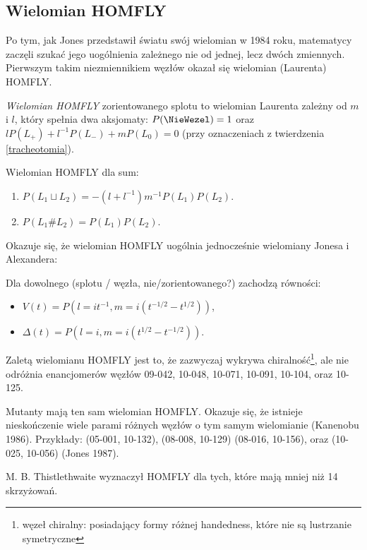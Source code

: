 \subsection{Wielomian HOMFLY}
Po tym, jak Jones przedstawił światu swój wielomian w 1984 roku, matematycy zaczęli szukać jego uogólnienia zależnego nie od jednej, lecz dwóch zmiennych.
Pierwszym takim niezmiennikiem węzłów okazał się wielomian (Laurenta) HOMFLY.

\begin{definicja}
\emph{Wielomian HOMFLY} zorientowanego splotu to wielomian Laurenta zależny od $m$ i $l$, który spełnia dwa  aksjomaty: $P(\NieWezel) = 1$ oraz $l P(L_+) + l^{-1} P(L_-) + mP(L_0) = 0$ (przy oznaczeniach z twierdzenia \ref{tracheotomia}).
\end{definicja}

\begin{twierdzenie} Wielomian HOMFLY dla sum:
\begin{enumerate}
	\item $P(L_1 \sqcup L_2) = - (l + l^{-1}) m^{-1} P(L_1) P(L_2)$.
	\item $P(L_1 \# L_2) = P(L_1) P(L_2)$.
\end{enumerate}
\end{twierdzenie}

Okazuje się, że wielomian HOMFLY uogólnia jednocześnie wielomiany Jonesa i Alexandera:

\begin{twierdzenie} Dla dowolnego (splotu / węzła, nie/zorientowanego?) zachodzą równości:
\begin{itemize}
\item $V(t) = P(l = it^{-1}, m = i(t^{-1/2} - t^{1/2}))$,
\item $\Delta(t) = P(l = i, m = i(t^{1/2} - t^{-1/2}))$.
\end{itemize}
\end{twierdzenie}

Zaletą wielomianu HOMFLY jest to, że zazwyczaj wykrywa chiralność\footnote{węzeł chiralny: posiadający formy różnej handedness, które nie są lustrzanie symetryczne}, ale nie odróżnia enancjomerów węzłów 09-042, 10-048, 10-071, 10-091, 10-104, oraz 10-125.

Mutanty mają ten sam wielomian HOMFLY.
Okazuje się, że istnieje nieskończenie wiele parami różnych węzłów o tym samym wielomianie (Kanenobu 1986).
Przykłady:  (05-001, 10-132), (08-008, 10-129) (08-016, 10-156), oraz (10-025, 10-056) (Jones 1987).

M. B. Thistlethwaite wyznaczył HOMFLY dla tych, które mają mniej niż 14 skrzyżowań.